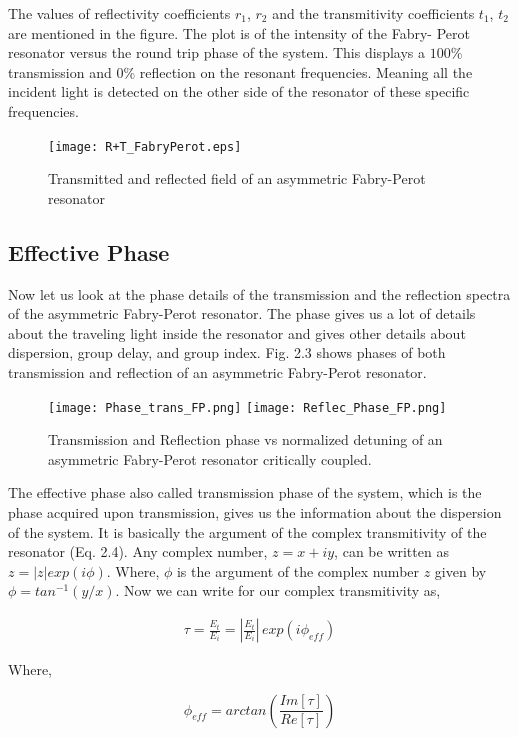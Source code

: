 The values of reflectivity coefficients $r_{1}$, $r_{2}$ and the transmitivity coefficients $t_{1}$, $t_{2}$ are mentioned in the figure. The plot is of the intensity of the Fabry- Perot resonator versus the round trip phase of the system. This displays a $100\%$ transmission and $0\%$ reflection on the resonant frequencies. Meaning all the incident light is detected on the other side of the resonator of these specific frequencies. 

\begin{figure}[h]
\centering
\texttt{[image: R+T\_FabryPerot.eps]}
\caption{Transmitted and reflected field of an asymmetric Fabry-Perot resonator}
\end{figure}


\subsection{Effective Phase}
Now let us look at the phase details of the transmission and the reflection spectra of the asymmetric Fabry-Perot resonator. The phase gives us a lot of details about the traveling light inside the resonator and gives other details about dispersion, group delay, and group index. Fig. 2.3 shows phases of both transmission and reflection of an asymmetric Fabry-Perot resonator.

\begin{figure}[h]
\texttt{[image: Phase\_trans\_FP.png]}
\texttt{[image: Reflec\_Phase\_FP.png]}
\caption{Transmission and Reflection phase vs normalized detuning of an asymmetric Fabry-Perot resonator critically coupled.}
\end{figure}

The effective phase also called transmission phase of the system, which is the phase acquired upon transmission, gives us the information about the dispersion of the system. It is basically the argument of the complex transmitivity of the resonator (Eq. 2.4). Any complex number, $z = x + iy$, can be written as $z = |z|exp(i\phi)$. Where, $\phi$ is the argument of the complex number $z$ given by $\phi = tan^{-1}(y/x)$. Now we can write for our complex transmitivity as,

\begin{align*}
\tau = \frac{E_{t}}{E_{i}} = |\frac{E_{t}}{E_{i}}|\,exp(i\phi_{eff})
\end{align*} 

Where,

\begin{equation}
\phi_{eff} = arctan(\frac{Im[\tau]}{Re[\tau]})
\end{equation}

